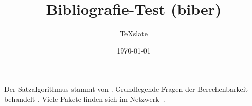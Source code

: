 \documentclass[12pt,a4paper]{article}
\title{Bibliografie-Test (biber)}
\author{TeXslate}
\date{\today}
\begin{document}
\maketitle

Der Satzalgorithmus stammt von \textcite{knuth1984}. Grundlegende Fragen der
Berechenbarkeit behandelt \textcite{turing1936}. Viele Pakete finden sich im
Netzwerk~\parencite{ctan2024}.

\printbibliography
\end{document}
